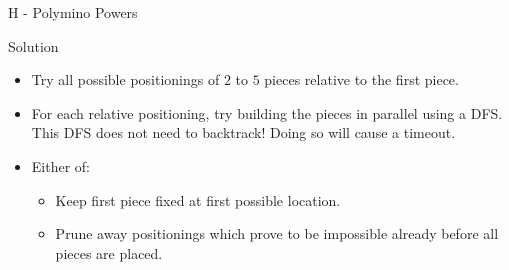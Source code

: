 \renewcommand{\insertshortauthor}{Andreas Bj\"orklund}
\begin{frame}{H - Polymino Powers}

\begin{block}{Solution}
  \begin{itemize}
	\item Try all possible positionings of $2$ to $5$ pieces relative to the first piece.
	\item For each relative positioning, try building the pieces in parallel using a DFS. This DFS does not need to backtrack! Doing so will cause a timeout. 
	\item Either of:
	\begin{itemize}
		\item Keep first piece fixed at first possible location.
		\item Prune away positionings which prove to be impossible already before all pieces are placed.
	\end{itemize}
  \end{itemize}
\end{block}

\end{frame}
